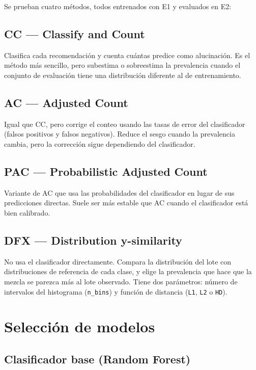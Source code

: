 \documentclass[11pt,a4paper]{article}
\begin{document}
Se prueban cuatro métodos, todos entrenados con E1 y evaluados en E2:

\subsection*{CC — Classify and Count}
Clasifica cada recomendación y cuenta cuántas predice como alucinación.
Es el método más sencillo, pero subestima o sobreestima la prevalencia
cuando el conjunto de evaluación tiene una distribución diferente al de
entrenamiento.

\subsection*{AC — Adjusted Count}
Igual que CC, pero corrige el conteo usando las tasas de error del
clasificador (falsos positivos y falsos negativos). Reduce el sesgo cuando
la prevalencia cambia, pero la corrección sigue dependiendo del clasificador.

\subsection*{PAC — Probabilistic Adjusted Count}
Variante de AC que usa las probabilidades del clasificador en lugar de sus
predicciones directas. Suele ser más estable que AC cuando el clasificador
está bien calibrado.

\subsection*{DFX — Distribution y-similarity}
No usa el clasificador directamente. Compara la distribución del lote con
distribuciones de referencia de cada clase, y elige la prevalencia que hace
que la mezcla se parezca más al lote observado. Tiene dos parámetros:
número de intervalos del histograma (\texttt{n\_bins}) y función de
distancia (\texttt{L1}, \texttt{L2} o \texttt{HD}).


\section{Selección de modelos}

\subsection{Clasificador base (Random Forest)}
\end{document}
